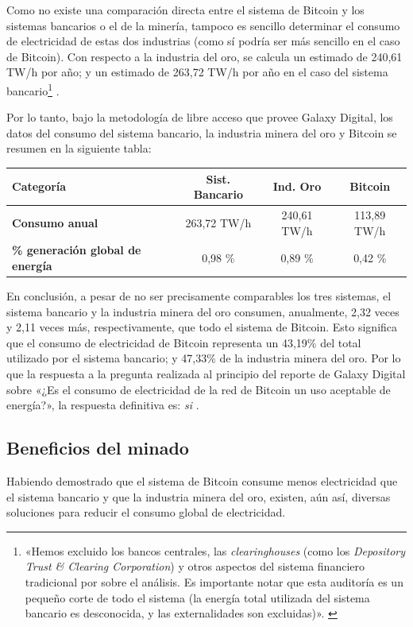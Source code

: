 \documentclass[12pt,a4paper,twoside]{book}
\begin{document}
Como no existe una comparación directa entre el sistema de Bitcoin y los sistemas bancarios o el de la minería, tampoco es sencillo determinar el consumo de electricidad de estas dos industrias (como sí podría ser más sencillo en el caso de Bitcoin).	 Con respecto a la industria del oro, se calcula un estimado de 240,61 TW/h por año; y un estimado de 263,72 TW/h por año en el caso del sistema bancario\footnote{«Hemos excluido los bancos centrales, las \textit{clearinghouses} (como los \textit{Depository Trust \& Clearing Corporation}) y otros aspectos del sistema financiero tradicional por sobre el análisis. Es importante notar que esta auditoría es un pequeño corte de todo el sistema (la energía total utilizada del sistema bancario es desconocida, y las externalidades son excluidas)». \cite[pág. 8]{galaxydigital}} \cite[págs. 5, 8]{galaxydigital}.

Por lo tanto, bajo la metodología de libre acceso que provee Galaxy Digital, los datos del consumo del sistema bancario, la industria minera del oro y Bitcoin se resumen en la siguiente tabla:

\begin{center}
\begin{tabular}{|K{3cm}|c|c|c|}
\hline 
\textbf{Categoría} & \textbf{Sist. Bancario} & \textbf{Ind. Oro} & \textbf{Bitcoin} \\ 
\hline 
\textbf{Consumo anual} & 263,72 TW/h & 240,61 TW/h & 113,89 TW/h \\
\hline 
\textbf{\% generación global de energía} & 0,98 \% & 0,89 \% & 0,42 \% \\ 
\hline 
\end{tabular} 
\end{center}

En conclusión, a pesar de no ser precisamente comparables los tres sistemas, el sistema bancario y la industria minera del oro consumen, anualmente, 2,32 veces y 2,11 veces más, respectivamente, que todo el sistema de Bitcoin. Esto significa que el consumo de electricidad de Bitcoin representa un 43,19\% del total utilizado por el sistema bancario; y 47,33\% de la industria minera del oro. Por lo que la respuesta a la pregunta realizada al principio del reporte de Galaxy Digital sobre «¿Es el consumo de electricidad de la red de Bitcoin un uso aceptable de energía?», la respuesta definitiva es: \textit{si} \cite[pág. 13]{galaxydigital}.

\subsection{Beneficios del minado}
Habiendo demostrado que el sistema de Bitcoin consume menos electricidad que el sistema bancario y que la industria minera del oro, existen, aún así, diversas soluciones para reducir el consumo global de electricidad.
\end{document}
